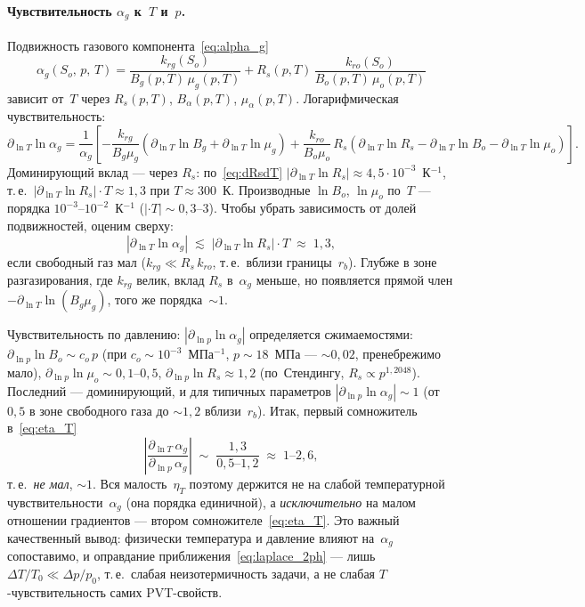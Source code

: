 ﻿\documentclass[12pt,a4paper]{article}
\begin{document}
\paragraph{Чувствительность $\alpha_g$ к~$T$ и~$p$.}
Подвижность газового компонента~\eqref{eq:alpha_g}
\begin{equation*}
  \alpha_g(S_o,\,p,\,T) = \frac{k_{rg}(S_o)}{B_g(p,T)\,\mu_g(p,T)}
  + R_s(p,T)\,\frac{k_{ro}(S_o)}{B_o(p,T)\,\mu_o(p,T)}
\end{equation*}
зависит от~$T$ через $R_s(p,T)$, $B_\alpha(p,T)$,
$\mu_\alpha(p,T)$. Логарифмическая чувствительность:
\begin{equation}\label{eq:alpha_T_sens}
  \partial_{\ln T}\ln\alpha_g
  = \frac{1}{\alpha_g}\!\left[
    -\frac{k_{rg}}{B_g\mu_g}(\partial_{\ln T}\ln B_g
      + \partial_{\ln T}\ln\mu_g)
    + \frac{k_{ro}}{B_o\mu_o}\,R_s(\partial_{\ln T}\ln R_s
      - \partial_{\ln T}\ln B_o - \partial_{\ln T}\ln\mu_o)
  \right].
\end{equation}
Доминирующий вклад --- через $R_s$: по~\eqref{eq:dRsdT}
$|\partial_{\ln T}\ln R_s| \approx 4{,}5\cdot 10^{-3}$~К$^{-1}$,
т.\,е.\ $|\partial_{\ln T}\ln R_s| \cdot T \approx 1{,}3$
при $T \approx 300$~К. Производные $\ln B_o$, $\ln\mu_o$
по~$T$ --- порядка $10^{-3}$--$10^{-2}$~К$^{-1}$
($|\cdot T| \sim 0{,}3$--$3$). Чтобы убрать зависимость
от долей подвижностей, оценим сверху:
\begin{equation}\label{eq:alpha_T_bound}
  |\partial_{\ln T}\ln\alpha_g| \;\lesssim\;
  |\partial_{\ln T}\ln R_s|\cdot T \;\approx\; 1{,}3,
\end{equation}
если свободный газ мал ($k_{rg} \ll R_s\,k_{ro}$,
т.\,е.\ вблизи границы~$r_b$). Глубже в зоне
разгазирования, где $k_{rg}$ велик, вклад $R_s$
в~$\alpha_g$ меньше, но появляется прямой член
$-\partial_{\ln T}\ln(B_g\mu_g)$, того же
порядка~$\sim 1$.

Чувствительность по давлению:
$|\partial_{\ln p}\ln\alpha_g|$ определяется
сжимаемостями: $\partial_{\ln p}\ln B_o \sim c_o\,p$
(при $c_o \sim 10^{-3}$~МПа$^{-1}$, $p\sim 18$~МПа ---
$\sim 0{,}02$, пренебрежимо мало),
$\partial_{\ln p}\ln\mu_o \sim 0{,}1$--$0{,}5$,
$\partial_{\ln p}\ln R_s \approx 1{,}2$ (по~Стендингу,
$R_s \propto p^{1{,}2048}$). Последний --- доминирующий,
и для типичных параметров
$|\partial_{\ln p}\ln\alpha_g| \sim 1$ (от $0{,}5$
в зоне свободного газа до $\sim 1{,}2$ вблизи~$r_b$).
Итак, первый сомножитель в~\eqref{eq:eta_T}
\begin{equation}\label{eq:eta_num1}
  \left|\frac{\partial_{\ln T}\,\alpha_g}
       {\partial_{\ln p}\,\alpha_g}\right|
  \;\sim\; \frac{1{,}3}{0{,}5\text{--}1{,}2}
  \;\approx\; 1\text{--}2{,}6,
\end{equation}
т.\,е.\ \emph{не мал}, $\sim 1$. Вся малость~$\eta_T$
поэтому держится не на слабой температурной
чувствительности~$\alpha_g$ (она порядка единичной),
а \emph{исключительно} на малом отношении градиентов
--- втором сомножителе~\eqref{eq:eta_T}. Это важный
качественный вывод: физически температура и давление
влияют на~$\alpha_g$ сопоставимо, и оправдание
приближения~\eqref{eq:laplace_2ph} --- лишь
$\Delta T / T_0 \ll \Delta p / p_0$, т.\,е.\ слабая
неизотермичность задачи, а не слабая $T$-чувствительность
самих PVT-свойств.
\end{document}
